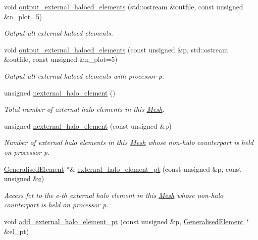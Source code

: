 \begin{DoxyCompactItemize}
void \hyperlink{classoomph_1_1Mesh_a9b165e729938cf8d11e348969ea40a25}{output\+\_\+external\+\_\+haloed\+\_\+elements} (std\+::ostream \&outfile, const unsigned \&n\+\_\+plot=5)
\begin{DoxyCompactList}\small\item\em Output all external haloed elements. \end{DoxyCompactList}\item 
void \hyperlink{classoomph_1_1Mesh_a6b816df2fde8c72be3fb20d1ea55cd72}{output\+\_\+external\+\_\+haloed\+\_\+elements} (const unsigned \&p, std\+::ostream \&outfile, const unsigned \&n\+\_\+plot=5)
\begin{DoxyCompactList}\small\item\em Output all external haloed elements with processor p. \end{DoxyCompactList}\item 
unsigned \hyperlink{classoomph_1_1Mesh_af7554deb7f9854272d849a6482a57d60}{nexternal\+\_\+halo\+\_\+element} ()
\begin{DoxyCompactList}\small\item\em Total number of external halo elements in this \hyperlink{classoomph_1_1Mesh}{Mesh}. \end{DoxyCompactList}\item 
unsigned \hyperlink{classoomph_1_1Mesh_ab7fd67d0eb09fb55b911f76100adf9fe}{nexternal\+\_\+halo\+\_\+element} (const unsigned \&p)
\begin{DoxyCompactList}\small\item\em Number of external halo elements in this \hyperlink{classoomph_1_1Mesh}{Mesh} whose non-\/halo counterpart is held on processor p. \end{DoxyCompactList}\item 
\hyperlink{classoomph_1_1GeneralisedElement}{Generalised\+Element} $\ast$\& \hyperlink{classoomph_1_1Mesh_aa4f7d6d4baaf855aeab9bfe5687f9ab9}{external\+\_\+halo\+\_\+element\+\_\+pt} (const unsigned \&p, const unsigned \&\hyperlink{cfortran_8h_a37cd013acc76697829c324bdd8562d82}{e})
\begin{DoxyCompactList}\small\item\em Access fct to the e-\/th external halo element in this \hyperlink{classoomph_1_1Mesh}{Mesh} whose non-\/halo counterpart is held on processor p. \end{DoxyCompactList}\item 
void \hyperlink{classoomph_1_1Mesh_a35c971cb52e791d82377b6ce299dbaec}{add\+\_\+external\+\_\+halo\+\_\+element\+\_\+pt} (const unsigned \&p, \hyperlink{classoomph_1_1GeneralisedElement}{Generalised\+Element} $\ast$\&el\+\_\+pt)

\end{DoxyCompactItemize}
